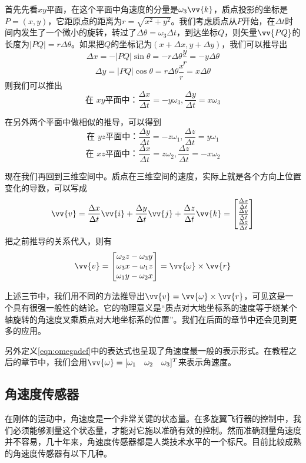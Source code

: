 \documentclass[11pt]{article}
\begin{document}
首先先看$xy$平面，在这个平面中角速度的分量是$\omega_3\vv{k}$，质点投影的坐标是$P=(x,y)$，它距原点的距离为$r = \sqrt{x^2+y^2}$。我们考虑质点从$P$开始，在$\Delta t$时间内发生了一个微小的旋转，转过了$\Delta\theta = \omega_3\Delta t$，到达坐标$Q$，则矢量$\vv{PQ}$的长度为$|PQ| = r\Delta\theta$。如果把$Q$的坐标记为$(x+\Delta x, y + \Delta y)$，我们可以推导出
$$
\Delta x = - |PQ|\sin\theta = - r\Delta\theta \frac{y}{r} = -y \Delta\theta
$$
$$
\Delta y =  |PQ|\cos\theta =  r\Delta\theta \frac{x}{r} = x \Delta\theta
$$
则我们可以推出
$$
\text{在 $xy$平面中：} \frac{\Delta x}{\Delta t} = -y \omega_3 ,  \frac{\Delta y}{\Delta t} = x \omega_3
$$

在另外两个平面中做相似的推导，可以得到
$$
\text{在 $yz$平面中：} \frac{\Delta y}{\Delta t} = -z \omega_1 ,  \frac{\Delta z}{\Delta t} = y \omega_1
$$
$$
\text{在 $xz$平面中：} \frac{\Delta x}{\Delta t} = z \omega_2 ,  \frac{\Delta z}{\Delta t} = -x \omega_2
$$

现在我们再回到三维空间中。质点在三维空间的速度，实际上就是各个方向上位置变化的导数，可以写成
$$
\vv{v} = \frac{\Delta x}{\Delta t} \vv{i} + \frac{\Delta y}{\Delta t} \vv{j} + \frac{\Delta z}{\Delta t} \vv{k} =
\begin{bmatrix}
\frac{\Delta x}{\Delta t} \\
\frac{\Delta y}{\Delta t} \\
\frac{\Delta z}{\Delta t} 
\end{bmatrix}
$$
把之前推导的关系代入，则有
$$
\vv{v} = \begin{bmatrix}
\omega_2z - \omega_3y \\
\omega_3x - \omega_1z \\
\omega_1y - \omega_2x 
\end{bmatrix}
= \vv{\omega} \times \vv{r}
$$

上述三节中，我们用不同的方法推导出$\vv{v} = \vv{\omega} \times \vv{r}$，可见这是一个具有很强一般性的结论。它的物理意义是“质点对大地坐标系的速度等于绕某个轴旋转的角速度叉乘质点对大地坐标系的位置”。我们在后面的章节中还会见到更多的应用。

另外定义\ref{eqn:omegadef}中的表达式也呈现了角速度最一般的表示形式。在教程之后的章节中，我们会用$\vv{\omega} = [\omega_1\ \ \  \omega_2\ \ \  \omega_3]^T$来表示角速度。

\subsection{角速度传感器}\label{sec:angularsensor}
在刚体的运动中，角速度是一个非常关键的状态量。在多旋翼飞行器的控制中，我们必须能够测量这个状态量，才能对它施以准确有效的控制。然而准确测量角速度并不容易，几十年来，角速度传感器都是人类技术水平的一个标尺。目前比较成熟的角速度传感器有以下几种。
\end{document}
